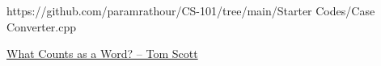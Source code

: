 \documentclass[../../Problems]{subfiles}
\begin{document}
{\begin{testcases}
	{https://github.com/paramrathour/CS-101/tree/main/Starter Codes/Case Converter.cpp}
\end{testcases}
\begin{funvideo}
\href{https://youtu.be/m8niIHChc1Y?t=51}{What Counts as a Word? -- Tom Scott}
\end{funvideo}
}
\end{document}
